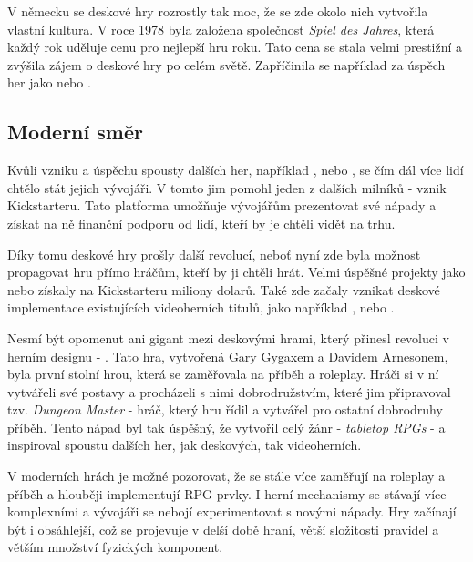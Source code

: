 V německu se deskové hry rozrostly tak moc, že se zde okolo nich vytvořila vlastní kultura. V roce 1978 byla založena společnost \textit{Spiel des Jahres}, která každý rok uděluje cenu pro nejlepší hru roku. Tato cena se stala velmi prestižní a zvýšila zájem o deskové hry po celém světě. Zapříčinila se například za úspěch her jako  nebo . \cite{attia_2018}

\subsection{Moderní směr}
\label{subsec:modern}

Kvůli vzniku a úspěchu spousty dalších her, například ,  nebo , se čím dál více lidí chtělo stát jejich vývojáři. V tomto jim pomohl jeden z dalších milníků - vznik Kickstarteru. Tato platforma umožňuje vývojářům prezentovat své nápady a získat na ně finanční podporu od lidí, kteří by je chtěli vidět na trhu. \cite{attia_2018}

Díky tomu deskové hry prošly další revolucí, neboť nyní zde byla možnost propagovat hru přímo hráčům, kteří by ji chtěli hrát. Velmi úspěšné projekty jako  nebo  získaly na Kickstarteru miliony dolarů. Také zde začaly vznikat deskové implementace existujících videoherních titulů, jako například ,  nebo . \cite{kickstarter}

Nesmí být opomenut ani gigant mezi deskovými hrami, který přinesl revoluci v herním designu - \textbf{}. Tato hra, vytvořená Gary Gygaxem a Davidem Arnesonem, byla první stolní hrou, která se zaměřovala na příběh a roleplay. Hráči si v ní vytvářeli své postavy a procházeli s nimi dobrodružstvím, které jim připravoval tzv. \textit{Dungeon Master} - hráč, který hru řídil a vytvářel pro ostatní dobrodruhy příběh. Tento nápad byl tak úspěšný, že vytvořil celý žánr - \textit{tabletop RPGs} - a inspiroval spoustu dalších her, jak deskových, tak videoherních. \cite{dnd_beyond_2023}

V moderních hrách je možné pozorovat, že se stále více zaměřují na roleplay a příběh a hlouběji implementují RPG prvky. I herní mechanismy se stávají více komplexními a vývojáři se nebojí experimentovat s novými nápady. Hry začínají být i obsáhlejší, což se projevuje v delší době hraní, větší složitosti pravidel a větším množství fyzických komponent.


